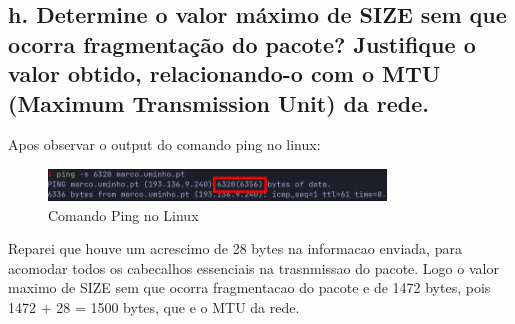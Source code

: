 \documentclass{article}
\begin{document}
\subsection*{h. Determine o valor máximo de SIZE sem que ocorra
fragmentação do pacote? Justifique o valor obtido, relacionando-o com o
MTU (Maximum Transmission Unit) da rede.}

Apos observar o output do comando ping no linux:
\begin{figure}[h]
    \centering
    \includegraphics[width=0.8\textwidth]{images/ping_cmd.png}
    \caption{\label{fig:ping_cmd}Comando Ping no Linux}
\end{figure}
Reparei que houve um acrescimo de 28 bytes na informacao enviada, para acomodar todos os cabecalhos essenciais na trasnmissao do pacote.
Logo o valor maximo de SIZE sem que ocorra fragmentacao do pacote e de 1472 bytes, pois 1472 + 28 = 1500 bytes, que e o MTU da rede.
\end{document}
